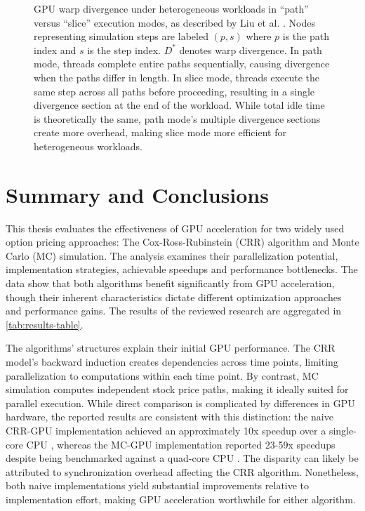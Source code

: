 \documentclass[english,12pt,a4paper,pdftex,sci,utf8]{aaltothesis}
\begin{document}
\begin{figure}[htbp]
\begin{tikzpicture}[
    node distance=0.9cm,
    every node/.style={minimum size=0.8cm, font=\footnotesize, thick, draw=black!70, inner sep=0pt}
]
\end{tikzpicture}
\caption{GPU warp divergence under heterogeneous workloads in ``path'' versus ``slice'' execution modes, as described by Liu et al. \cite{liu2010efficient}. Nodes representing simulation steps are labeled $(p,s)$ where $p$ is the path index and $s$ is the step index. $D^*$ denotes warp divergence. In path mode, threads complete entire paths sequentially, causing divergence when the paths differ in length. In slice mode, threads execute the same step across all paths before proceeding, resulting in a single divergence section at the end of the workload. While total idle time is theoretically the same, path mode's multiple divergence sections create more overhead, making slice mode more efficient for heterogeneous workloads. }

\label{fig:gpu-divergence}
\end{figure}

\section{Summary and Conclusions}  \label{sec:summary-conclusions}
This thesis evaluates the effectiveness of GPU acceleration for two widely used option pricing approaches: The Cox-Ross-Rubinstein (CRR) algorithm and Monte Carlo (MC) simulation. The analysis examines their parallelization potential, implementation strategies, achievable speedups and performance bottlenecks. The data show that both algorithms benefit significantly from GPU acceleration, though their inherent characteristics dictate different optimization approaches and performance gains. The results of the reviewed research are aggregated in \cref{tab:results-table}.

The algorithms' structures explain their initial GPU performance. The CRR model's backward induction creates dependencies across time points, limiting parallelization to computations within each time point. By contrast, MC simulation computes independent stock price paths, making it ideally suited for parallel execution. While direct comparison is complicated by differences in GPU hardware, the reported results are consistent with this distinction: the naive CRR-GPU implementation achieved an approximately 10x speedup over a single-core CPU \cite{pharr2005gpu}, whereas the MC-GPU implementation reported 23-59x speedups despite being benchmarked against a quad-core CPU \cite{nguyen2007gpu}. The disparity can likely be attributed to synchronization overhead affecting the CRR algorithm. Nonetheless, both naive implementations yield substantial improvements relative to implementation effort, making GPU acceleration worthwhile for either algorithm. 
\end{document}
